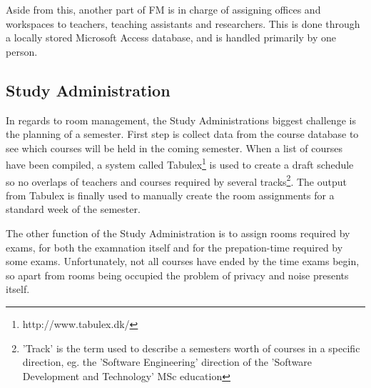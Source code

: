 Aside from this, another part of FM is in charge of assigning offices and workspaces to teachers, teaching assistants and researchers. This is done through a locally stored Microsoft Access database, and is handled primarily by one person.

\subsection{Study Administration}
In regards to room management, the Study Administrations biggest challenge is the planning of a semester. First step is collect data from the course database to see which courses will be held in the coming semester. When a list of courses have been compiled, a system called Tabulex\footnote{http://www.tabulex.dk/} is used to create a draft schedule so no overlaps of teachers and courses required by several tracks\footnote{'Track' is the term used to describe a semesters worth of courses in a specific direction, eg. the 'Software Engineering' direction of the 'Software Development and Technology' MSc education}. The output from Tabulex is finally used to manually create the room assignments for a standard week of the semester.

The other function of the Study Administration is to assign rooms required by exams, for both the examnation itself and for the prepation-time required by some exams. Unfortunately, not all courses have ended by the time exams begin, so apart from rooms being occupied the problem of privacy and noise presents itself.\\

\label{sec:scope}
